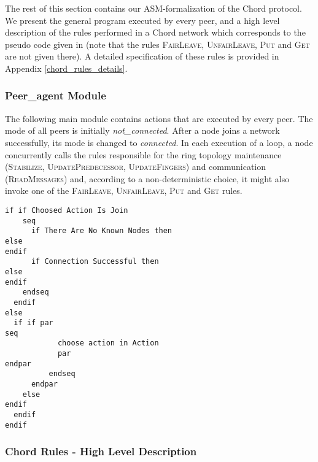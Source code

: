 \documentclass{amsart}
\theoremstyle{definition}
\begin{document}
The rest of this section contains our ASM-formalization of the
Chord protocol. We present the general program executed by every
peer, and a high level description of the rules performed in a
Chord network which corresponds to the pseudo code given in
\cite{Chord-IEEE} (note that the rules \textsc{FairLeave},
\textsc{UnfairLeave}, \textsc{Put} and \textsc{Get} are not given
there). A detailed specification of these rules is provided in
Appendix \ref{chord_rules_details}.


\subsubsection{Peer\_agent Module}

The following main module contains actions that are executed by
every peer. The mode of all peers is initially {\em
not\_connected}. After a node joins a network successfully, its
mode is changed to {\em connected}. In each execution of a loop, a
node concurrently calls the rules responsible for the ring
topology maintenance (\textsc{Stabilize},
\textsc{UpdatePredecessor}, \textsc{UpdateFingers}) and
communication (\textsc{ReadMessages}) and, according to a
non-deterministic choice, it might also invoke one of the
\textsc{FairLeave}, \textsc{UnfairLeave}, \textsc{Put} and
\textsc{Get} rules.

\begin{lstlisting}[escapechar=\%]
if if Choosed Action Is Join
    seq
      if There Are No Known Nodes then
else
endif
      if Connection Successful then
else
endif
    endseq
  endif
else
  if if par
seq
            choose action in Action
            par
endpar
          endseq
      endpar
    else
endif
  endif
endif
\end{lstlisting}

\subsubsection{Chord Rules - High Level Description}
\end{document}
